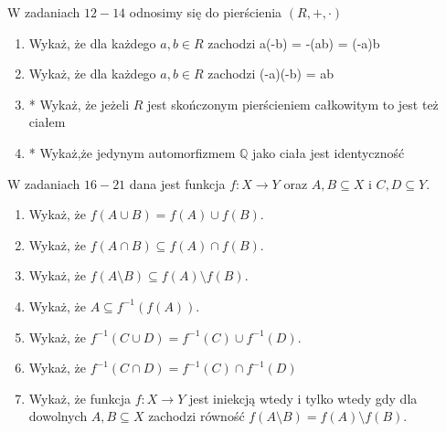 \documentclass{article}
\begin{document}
W zadaniach $12-14$ odnosimy się do pierścienia $(R, +, \cdot)$
\begin{enumerate}[resume]
    \item Wykaż, że dla każdego $a,b \in R$ zachodzi a(-b) = -(ab) = (-a)b
    \item Wykaż, że dla każdego $a,b \in R$ zachodzi (-a)(-b) = ab 
    \item * Wykaż, że jeżeli $R$ jest skończonym pierścieniem całkowitym to jest też ciałem
    \item * Wykaż,że jedynym automorfizmem $\mathbb{Q}$ jako ciała jest identyczność
\end{enumerate}
W zadaniach $16-21$ dana jest funkcja $f : X \rightarrow Y$ oraz $A,B \subseteq X$ i  $C,D \subseteq Y$.
\begin{enumerate}[resume]
    \item Wykaż, że $f(A \cup B) = f(A) \cup f(B)$.
    \item Wykaż, że $f(A \cap B) \subseteq f(A) \cap f(B)$.
    \item Wykaż, że $f(A \setminus B) \subseteq f(A) \setminus f(B)$. 
    \item Wykaż, że $A \subseteq f^{-1}(f(A))$.
    \item Wykaż, że $f^{-1}(C \cup D) =  f^{-1}(C) \cup f^{-1}(D).$
    \item Wykaż, że $f^{-1}(C \cap D) = f^{-1}(C) \cap f^{-1}(D)$
    \item Wykaż, że funkcja $f : X \rightarrow Y$ jest iniekcją wtedy i tylko wtedy gdy dla dowolnych  $A, B \subseteq X$ zachodzi równość $f(A\setminus B) = f(A) \setminus f(B)$.
\end{enumerate}
\end{document}
